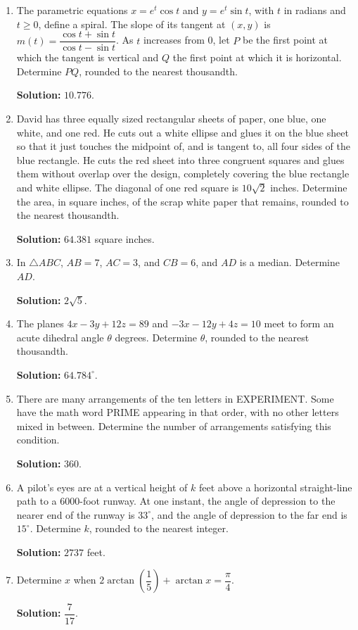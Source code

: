 \documentclass[10pt]{article}
\begin{document}
\begin{enumerate}
\item The parametric equations $x=e^t\cos t$ and $y=e^t\sin t$, with $t$ in radians and $t\ge0$, define a spiral. The slope of its tangent at $(x,y)$ is $m(t)=\dfrac{\cos t+\sin t}{\cos t-\sin t}$. As $t$ increases from 0, let $P$ be the first point at which the tangent is vertical and $Q$ the first point at which it is horizontal. Determine $PQ$, rounded to the nearest thousandth.\par\textbf{Solution:} $10.776$.
\item David has three equally sized rectangular sheets of paper, one blue, one white, and one red. He cuts out a white ellipse and glues it on the blue sheet so that it just touches the midpoint of, and is tangent to, all four sides of the blue rectangle. He cuts the red sheet into three congruent squares and glues them without overlap over the design, completely covering the blue rectangle and white ellipse. The diagonal of one red square is $10\sqrt2$ inches. Determine the area, in square inches, of the scrap white paper that remains, rounded to the nearest thousandth.\par\textbf{Solution:} $64.381$ square inches.
\item In $\triangle ABC$, $AB=7$, $AC=3$, and $CB=6$, and $AD$ is a median. Determine $AD$.\par\textbf{Solution:} $2\sqrt5$.
\item The planes $4x-3y+12z=89$ and $-3x-12y+4z=10$ meet to form an acute dihedral angle $\theta$ degrees. Determine $\theta$, rounded to the nearest thousandth.\par\textbf{Solution:} $64.784^\circ$.
\item There are many arrangements of the ten letters in EXPERIMENT. Some have the math word PRIME appearing in that order, with no other letters mixed in between. Determine the number of arrangements satisfying this condition.\par\textbf{Solution:} $360$.
\item A pilot's eyes are at a vertical height of $k$ feet above a horizontal straight-line path to a 6000-foot runway. At one instant, the angle of depression to the nearer end of the runway is $33^\circ$, and the angle of depression to the far end is $15^\circ$. Determine $k$, rounded to the nearest integer.\par\textbf{Solution:} $2737$ feet.
\item Determine $x$ when $2\arctan\left(\dfrac15\right)+\arctan x=\dfrac{\pi}{4}$.\par\textbf{Solution:} $\dfrac{7}{17}$.

\end{enumerate}
\end{document}

